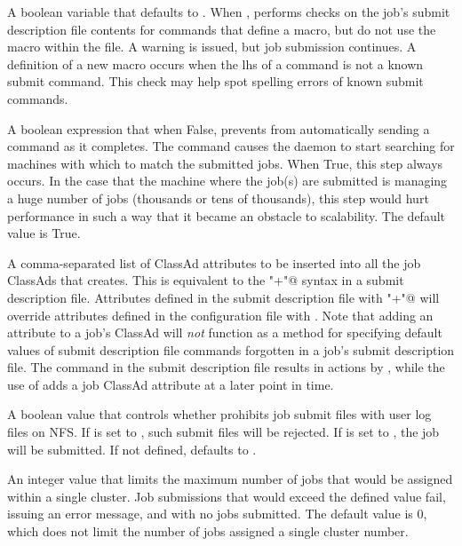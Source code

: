 \begin{description}
\label{param:WarnOnUnusedSubmitFileMacros}
\item[\Macro{WARN\_ON\_UNUSED\_SUBMIT\_FILE\_MACROS}]
  A boolean variable that defaults to .
  When , 
  performs checks on the job's submit description file contents
  for commands that define a macro, but do not use the macro within
  the file.
  A warning is issued, but job submission continues.
  A definition of a new macro occurs when the lhs of a command is not
  a known submit command.  This check may help spot spelling errors
  of known submit commands.

\label{param:SubmitSendReschedule}
\item[\Macro{SUBMIT\_SEND\_RESCHEDULE}]
  A boolean expression that when False, prevents  from
  automatically sending a  command as it completes.
  The  command causes the  daemon
  to start searching for machines with which to match the submitted
  jobs.  When True, this step always occurs.
  In the case that the machine where the job(s) are submitted is
  managing a huge number of jobs (thousands or tens of thousands),
  this step would hurt performance in such a way that it became
  an obstacle to scalability.
  The default value is True.

\label{param:SubmitExprs}
\item[\Macro{SUBMIT\_EXPRS}]
  A comma-separated list of ClassAd attributes to be inserted into all 
  the job ClassAds that  creates.  This is equivalent
  to the \verb@"+"@ syntax in a submit description file.
  Attributes defined in the submit description file with \verb@"+"@ will
  override attributes defined in the configuration file with
  . 
  Note that adding an attribute to a job's ClassAd will \emph{not} function
  as a method for specifying default values of submit description file commands
  forgotten in a job's submit description file.
  The command in the submit description file results in actions by
  ,
  while the use of  adds a job ClassAd attribute
  at a later point in time.

\label{param:LogOnNfsIsError}
\item[\Macro{LOG\_ON\_NFS\_IS\_ERROR}]
  A boolean value that controls whether  prohibits
  job submit files with user log files on NFS.  If
   is set to , such
  submit files will be rejected.  If 
  is set to ,
  the job will be submitted.  If not defined,
   defaults to .

\label{param:SubmitMaxProcsInCluster}
\item[\Macro{SUBMIT\_MAX\_PROCS\_IN\_CLUSTER}]
  An integer value that limits the maximum number of jobs that would
  be assigned within a single cluster.  Job submissions that would exceed
  the defined value fail, issuing an error message, and with no jobs
  submitted.
  The default value is 0, which does not limit the number of jobs
  assigned a single cluster number.

\end{description}

